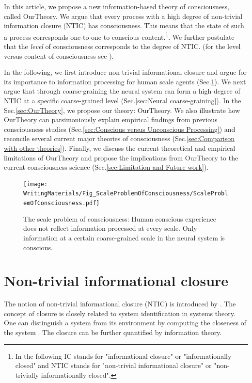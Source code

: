\documentclass[utf8]{article}
\begin{document}
		In this article, we propose a new information-based theory of consciousness, called \ac{OurTheory}. We argue that every process with a high degree of non-trivial information closure (NTIC) has consciousness. This means that the state of such a process corresponds one-to-one to conscious content.\footnote{In the following IC stands for "informational closure" or "informationally closed" and NTIC stands for "non-trivial informational closure" or "non-trivially informationally closed".}. We further postulate that the \textit{level} of consciousness corresponds to the degree of NTIC. (for the level versus content of consciousness see \cite{laureys2005neural, overgaard2010neural}).
		
		In the following, we first introduce non-trivial informational closure and argue for its importance to information processing for human scale agents (Sec.\ref{sec:Non-trivial informational closure}). We next argue that through coarse-graining the neural system can form a high degree of NTIC at a specific coarse-grained level (Sec.\ref{sec:Neural coarse-graining}). In the Sec.\ref{sec:OurTheory}, we propose our theory: \acf{OurTheory}. We also illustrate how \ac{OurTheory} can parsimoniously explain empirical findings from previous consciousness studies (Sec.\ref{sec:Conscious versus Unconscious Processing}) and reconcile several current major theories of consciousness (Sec.\ref{sec:Comparison with other theories}). Finally, we discuss the current theoretical and empirical limitations of \ac{OurTheory} and propose the implications from \ac{OurTheory} to the current consciousness science (Sec.\ref{sec:Limitation and Future work}). 


		\begin{figure}[H]
		    \centering
			\texttt{[image: WritingMaterials/Fig\_ScaleProblemOfConsciousness/ScaleProblemOfConsciousness.pdf]}
			\caption{The scale problem of consciousness: Human conscious experience does not reflect information processed at every scale. Only information at a certain coarse-grained scale in the neural system is conscious.}
			\label{fig:scaleproblem}
	   	\end{figure}


	\section{Non-trivial informational closure} \label{sec:Non-trivial informational closure}
		The notion of non-trivial informational closure (NTIC) is introduced by \cite{BERTSCHINGER.2006}. The concept of closure is closely related to system identification in systems theory. One can distinguish a system from its environment by computing the closeness of the system \citep{maturana1991autopoiesis, rosen1991life, pattee2012evolving, luhmann1995probleme}. The closure can be further quantified by information theory.
\end{document}
